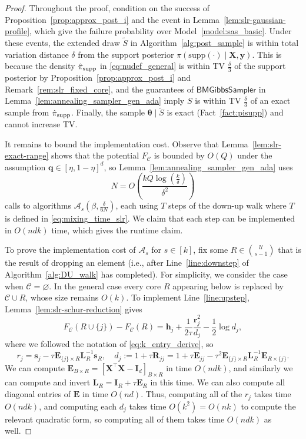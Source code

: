 \documentclass[11pt]{article}
\newcommand{\defeq}{:=}
\newcommand{\1}{\mathbf{1}}
\newcommand{\0}{\mathbf{0}}
\newcommand{\id}{\mathbf{I}}
\newcommand{\Par}[1]{\left(#1\right)}
\newcommand{\alg}{\mathcal{A}}
\newcommand{\supp}{\mathrm{supp}}
\newcommand{\vth}{\boldsymbol{\theta}}
\newcommand{\BMGS}{\mathsf{BMGibbsSampler}}
\newcommand{\hpi}{\hat{\pi}}
\newcommand{\hpisupp}{\hpi_{\textup{supp}}}
\newcommand{\me}{{\mathbf{E}}}
\newcommand{\ml}{{\mathbf{L}}}
\newcommand{\mr}{{\mathbf{R}}}
\newcommand{\mx}{{\mathbf{X}}}
\newcommand{\vh}{{\mathbf{h}}}
\newcommand{\vq}{{\mathbf{q}}}
\newcommand{\vr}{{\mathbf{r}}}
\newcommand{\vs}{{\mathbf{s}}}
\newcommand{\vy}{{\mathbf{y}}}
\newcommand{\calA}{{\mathcal{A}}}
\newcommand{\calC}{{\mathcal{C}}}
\newcommand{\calU}{{\mathcal{U}}}
\renewcommand{\emptyset}{\varnothing}
\begin{document}
\begin{proof}
Throughout the proof, condition on the success of Proposition~\ref{prop:approx_post_i} and the event in Lemma~\ref{lem:slr-gaussian-profile}, which give the failure probability over Model~\ref{model:sas_basic}. Under these events, the extended draw $\widetilde{S}$ in Algorithm~\ref{alg:post_sample} is within total variation distance $\delta$ from the support posterior $\pi(\supp(\cdot)\mid \mx, \vy)$. This is because the density $\hpisupp$ in \eqref{eq:nudef_general} is within TV $\frac \delta 3$ of the support posterior by Proposition~\ref{prop:approx_post_i} and Remark~\ref{rem:slr_fixed_core}, and 
the guarantees of $\BMGS$ in Lemma~\ref{lem:annealing_sampler_gen_ada} imply $S$ is within TV $\frac \delta 3$ of an exact sample from $\hpisupp$. Finally, the sample $\vth \mid \widetilde{S}$ is exact (Fact~\ref{fact:pisupp}) and cannot increase TV.

It remains to bound the implementation cost. Observe that Lemma~\ref{lem:slr-exact-range} shows that the potential $F_{\calC}$ is bounded by $O(Q)$ under the assumption $\vq \in [\eta, 1-\eta]^d$, so Lemma~\ref{lem:annealing_sampler_gen_ada} uses
\[N = O\Par{\frac{kQ\log(\frac{k}{\delta})}{\delta^2}}\]
calls to algorithms $\calA_s(\beta, \frac \delta {6N})$, each using $T$ steps of the down-up walk where $T$ is defined in \eqref{eq:mixing_time_slr}. We claim that each step can be implemented in $O(ndk)$ time, which gives the runtime claim.

To prove the implementation cost of $\alg_s$ for $s \in [k]$, fix some $R \in \binom{\calU}{s-1}$ that is the result of dropping an element (i.e., after Line~\ref{line:downstep} of Algorithm~\ref{alg:DU_walk} has completed). For simplicity, we consider the case when $\calC = \emptyset$. In the general case every core $R$ appearing below is replaced by $\calC \cup R$, whose size remains $O(k)$. To implement Line~\ref{line:upstep}, Lemma~\ref{lem:slr-schur-reduction} gives
\[
    F_\calC(R\cup\{j\})-F_\calC(R)
    =
    \vh_j
    +
    \frac{1}{2\tau}
    \frac{\vr_j^2}{d_j}
    -
    \frac12\log d_j,
\]
where we followed the notation of \eqref{eq:k_entry_derive}, so
\[
    r_j
    =
    \vs_j
    -
    \tau
    \me_{\{j\}\times R}
    \ml_R^{-1}\vs_R,\quad  d_j \defeq 1 + \tau\mr_{jj} = 1 + \tau\me_{jj} - \tau^2 \me_{\{j\} \times R} \ml_R^{-1} \me_{R \times \{j\}}.
\]
We can compute $\me_{B \times R} = [\mx^\top \mx - \id_d]_{B \times R}$ in time $O(ndk)$, and similarly we can compute and invert $\ml_R = \id_R + \tau \me_R$ in this time. We can also compute all diagonal entries of $\me$ in time $O(nd)$. Thus, computing all of the $r_j$ takes time $O(ndk)$, and computing each $d_j$ takes time $O(k^2) = O(nk)$ to compute the relevant quadratic form, so computing all of them takes time $O(ndk)$ as well. 

\end{proof}
\end{document}
